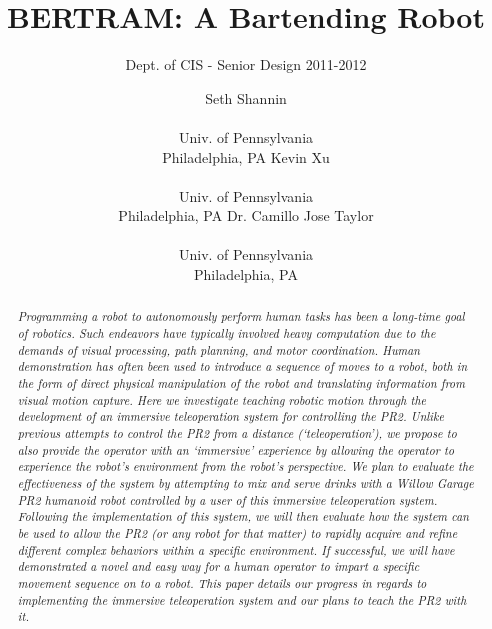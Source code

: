 \documentclass{sig-alternate}
\begin{document}
 

\title{BERTRAM: A Bartending Robot}

\subtitle{Dept. of CIS - Senior Design 2011-2012}
\author{
\alignauthor Seth Shannin \\  \\ Univ. of Pennsylvania \\ Philadelphia, PA
\alignauthor Kevin Xu \\  \\ Univ. of Pennsylvania \\ Philadelphia, PA
\alignauthor Dr. Camillo Jose Taylor \\  \\ Univ. of Pennsylvania \\ Philadelphia, PA}
\date{}
\maketitle

\begin{abstract}
\textit{\indent Programming a robot to autonomously perform human tasks has been a 
long-time goal of robotics. Such endeavors have typically involved heavy 
computation due to the demands of visual processing, path planning, and motor 
coordination. Human demonstration has often been used to introduce a sequence 
of moves to a robot, both in the form of direct physical manipulation of the 
robot and translating information from visual motion capture. Here we 
investigate teaching robotic motion through the development of an immersive
teleoperation system for controlling the PR2. Unlike previous attempts to
control the PR2 from a distance (`teleoperation'), we propose to also provide the
operator with an `immersive' experience by allowing the operator to experience the robot's
environment from the robot's perspective. We plan to evaluate the effectiveness of the system
by attempting to mix and serve drinks with a Willow Garage PR2 
humanoid robot controlled by a user of this immersive teleoperation system.
\\\indent Following the implementation of this system, we will then evaluate how the system can be used to allow
the PR2 (or any robot for that matter) to rapidly acquire and refine different complex behaviors within a specific environment. If successful, we will have demonstrated a novel and easy way for a
human operator to impart a specific movement sequence on to a robot. This paper details our progress in regards to implementing the immersive teleoperation system and our plans to teach the PR2 with it.}
\end{abstract}
\end{document}
